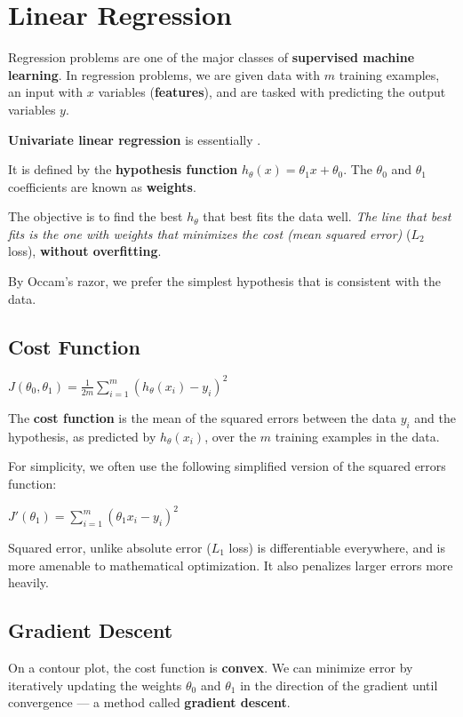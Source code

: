 \section{Linear Regression}
    Regression problems are one of the major classes of \textbf{supervised machine learning}.
    In regression problems, we are given data with $m$ training examples, an input with $x$ variables (\textbf{features}), and are tasked with predicting the output variables $y$.

    \textbf{Univariate linear regression} is essentially .

    It is defined by the \textbf{hypothesis function} $h_\theta(x) = \theta_1x + \theta_0$. The $\theta_0$ and $\theta_1$ coefficients are known as \textbf{weights}.

    The objective is to find the best $h_\theta$ that best fits the data well. \emph{The line that best fits is the one with weights that minimizes the cost (mean squared error)} ($L_2$ loss), \textbf{without overfitting}.

    By Occam's razor, we prefer the simplest hypothesis that is consistent with the data.

    \subsection{Cost Function}
        $J(\theta_0, \theta_1) = \frac{1}{2m} \sum_{i=1}^m (h_\theta(x_i) - y_i)^2$

        The \textbf{cost function} is the mean of the squared errors between the data $y_i$ and the hypothesis, as predicted by $h_\theta(x_i)$, over the $m$ training examples in the data.

        For simplicity, we often use the following simplified version of the squared errors function:

        $J'(\theta_1) = \sum_{i=1}^m (\theta_1 x_i - y_i)^2$

        Squared error, unlike absolute error ($L_1$ loss) is differentiable everywhere, and is more amenable to mathematical optimization.
        It also penalizes larger errors more heavily.

    \subsection{Gradient Descent}
        On a contour plot, the cost function is \textbf{convex}.
        We can minimize error by iteratively updating the weights $\theta_0$ and $\theta_1$ in the direction of the gradient until convergence --- a method called \textbf{gradient descent}.

